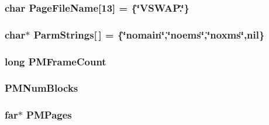 \label{ID__PM_8C_a546fb248e72f20f38e68c4a913206f25}
\hypertarget{ID__PM_8C_a3d2a1c78f3a8c484f8b2ed0cbe566453}{
\subsubsection[{PageFileName}]{\setlength{\rightskip}{0pt plus 5cm}char {\bf PageFileName}\mbox{[}13\mbox{]} = \{\char`\"{}VSWAP.\char`\"{}\}}}
\label{ID__PM_8C_a3d2a1c78f3a8c484f8b2ed0cbe566453}
\hypertarget{ID__PM_8C_af8599e1c1fbb3afabbdaa22e7c4a94b0}{
\subsubsection[{ParmStrings}]{\setlength{\rightskip}{0pt plus 5cm}char$\ast$ {\bf ParmStrings}\mbox{[}$\,$\mbox{]} = \{\char`\"{}nomain\char`\"{},\char`\"{}noems\char`\"{},\char`\"{}noxms\char`\"{},nil\}}}
\label{ID__PM_8C_af8599e1c1fbb3afabbdaa22e7c4a94b0}
\hypertarget{ID__PM_8C_ab8c38b967702c00419fc3c6b3bcb54af}{
\subsubsection[{PMFrameCount}]{\setlength{\rightskip}{0pt plus 5cm}long {\bf PMFrameCount}}}
\label{ID__PM_8C_ab8c38b967702c00419fc3c6b3bcb54af}
\hypertarget{ID__PM_8C_a284592ad8b98c33e06c6e37f312b443e}{
\subsubsection[{PMNumBlocks}]{ {\bf PMNumBlocks}}}
\label{ID__PM_8C_a284592ad8b98c33e06c6e37f312b443e}
\hypertarget{ID__PM_8C_aac6e5bfd3ae3497c8b721679578d73f1}{
\subsubsection[{PMPages}]{ far$\ast$ {\bf PMPages}}}
